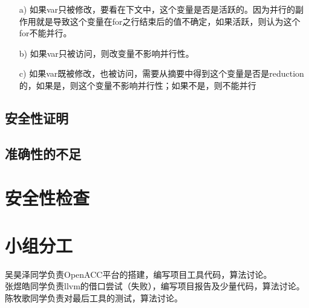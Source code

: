 \documentclass[12pt]{article}
\begin{document}
\begin{itemize}
\begin{description}
							\begin{itemize}
								\item[a)] 如果var只被修改，要看在下文中，这个变量是否是活跃的。因为并行的副作用就是导致这个变量在for之行结束后的值不确定，如果活跃，则认为这个for不能并行。
								\item[b)] 如果var只被访问，则改变量不影响并行性。
								\item[c)] 如果var既被修改，也被访问，需要从摘要中得到这个变量是否是reduction的，如果是，则这个变量不影响并行性；如果不是，则不能并行
							\end{itemize}
					\end{description}
			\end{itemize}
		\subsection{安全性证明}
		\subsection{准确性的不足}
	\section{安全性检查}
	\section{小组分工}
		吴昊泽同学负责OpenACC平台的搭建，编写项目工具代码，算法讨论。\\
		\indent 张煜皓同学负责llvm的借口尝试（失败），编写项目报告及少量代码，算法讨论。 \\
		\indent 陈牧歌同学负责对最后工具的测试，算法讨论。
		



\end{document}
